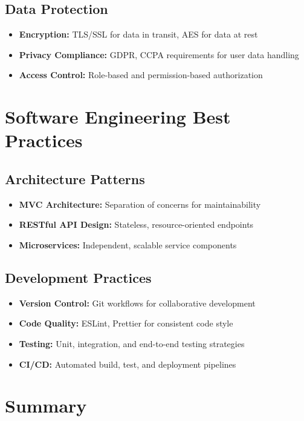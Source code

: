 \subsection{Data Protection}

\begin{itemize}
    \item \textbf{Encryption:} TLS/SSL for data in transit, AES for data at rest
    \item \textbf{Privacy Compliance:} GDPR, CCPA requirements for user data handling
    \item \textbf{Access Control:} Role-based and permission-based authorization
\end{itemize}

\section{Software Engineering Best Practices}

\subsection{Architecture Patterns}

\begin{itemize}
    \item \textbf{MVC Architecture:} Separation of concerns for maintainability
    \item \textbf{RESTful API Design:} Stateless, resource-oriented endpoints
    \item \textbf{Microservices:} Independent, scalable service components
\end{itemize}

\subsection{Development Practices}

\begin{itemize}
    \item \textbf{Version Control:} Git workflows for collaborative development
    \item \textbf{Code Quality:} ESLint, Prettier for consistent code style
    \item \textbf{Testing:} Unit, integration, and end-to-end testing strategies
    \item \textbf{CI/CD:} Automated build, test, and deployment pipelines
\end{itemize}

\section{Summary}

